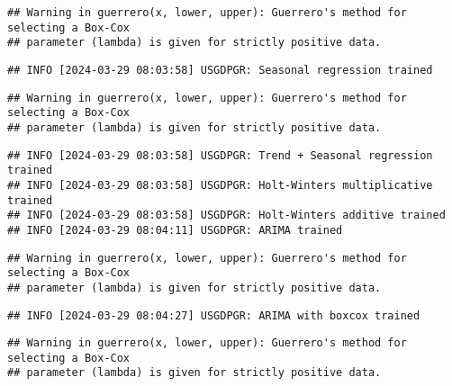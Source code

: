 \documentclass[
]{article}
\begin{document}
\begin{verbatim}
## Warning in guerrero(x, lower, upper): Guerrero's method for selecting a Box-Cox
## parameter (lambda) is given for strictly positive data.
\end{verbatim}

\begin{verbatim}
## INFO [2024-03-29 08:03:58] USGDPGR: Seasonal regression trained
\end{verbatim}

\begin{verbatim}
## Warning in guerrero(x, lower, upper): Guerrero's method for selecting a Box-Cox
## parameter (lambda) is given for strictly positive data.
\end{verbatim}

\begin{verbatim}
## INFO [2024-03-29 08:03:58] USGDPGR: Trend + Seasonal regression trained
## INFO [2024-03-29 08:03:58] USGDPGR: Holt-Winters multiplicative trained
## INFO [2024-03-29 08:03:58] USGDPGR: Holt-Winters additive trained
## INFO [2024-03-29 08:04:11] USGDPGR: ARIMA trained
\end{verbatim}

\begin{verbatim}
## Warning in guerrero(x, lower, upper): Guerrero's method for selecting a Box-Cox
## parameter (lambda) is given for strictly positive data.
\end{verbatim}

\begin{verbatim}
## INFO [2024-03-29 08:04:27] USGDPGR: ARIMA with boxcox trained
\end{verbatim}

\begin{verbatim}
## Warning in guerrero(x, lower, upper): Guerrero's method for selecting a Box-Cox
## parameter (lambda) is given for strictly positive data.
\end{verbatim}
\end{document}
